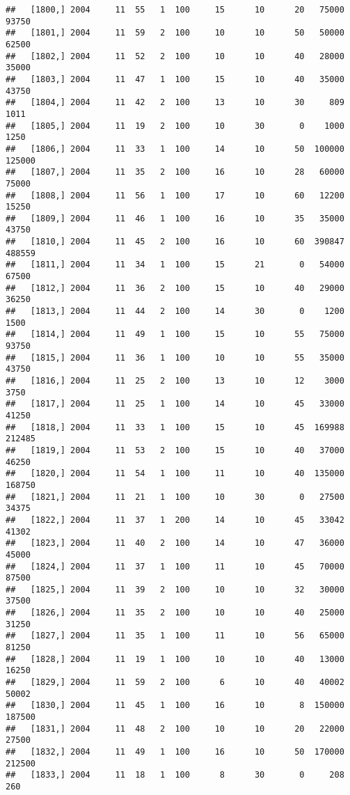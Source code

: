 \documentclass{article}\usepackage[]{graphicx}\usepackage[]{color}
\makeatletter
\newenvironment{kframe}{%
 \def\at@end@of@kframe{}%
 \ifinner\ifhmode%
  \def\at@end@of@kframe{\end{minipage}}%
  \begin{minipage}{\columnwidth}%
 \fi\fi%
 \def\FrameCommand##1{\hskip\@totalleftmargin \hskip-\fboxsep
 \colorbox{shadecolor}{##1}\hskip-\fboxsep
     \hskip-\linewidth \hskip-\@totalleftmargin \hskip\columnwidth}%
 \MakeFramed {\advance\hsize-\width
   \@totalleftmargin\z@ \linewidth\hsize
   \@setminipage}}%
 {\par\unskip\endMakeFramed%
 \at@end@of@kframe}
\newenvironment{knitrout}{}{} %
\makeatother
\begin{document}
\begin{knitrout}
\begin{kframe}
\begin{verbatim}
##   [1800,] 2004     11  55   1  100     15      10      20   75000   93750
##   [1801,] 2004     11  59   2  100     10      10      50   50000   62500
##   [1802,] 2004     11  52   2  100     10      10      40   28000   35000
##   [1803,] 2004     11  47   1  100     15      10      40   35000   43750
##   [1804,] 2004     11  42   2  100     13      10      30     809    1011
##   [1805,] 2004     11  19   2  100     10      30       0    1000    1250
##   [1806,] 2004     11  33   1  100     14      10      50  100000  125000
##   [1807,] 2004     11  35   2  100     16      10      28   60000   75000
##   [1808,] 2004     11  56   1  100     17      10      60   12200   15250
##   [1809,] 2004     11  46   1  100     16      10      35   35000   43750
##   [1810,] 2004     11  45   2  100     16      10      60  390847  488559
##   [1811,] 2004     11  34   1  100     15      21       0   54000   67500
##   [1812,] 2004     11  36   2  100     15      10      40   29000   36250
##   [1813,] 2004     11  44   2  100     14      30       0    1200    1500
##   [1814,] 2004     11  49   1  100     15      10      55   75000   93750
##   [1815,] 2004     11  36   1  100     10      10      55   35000   43750
##   [1816,] 2004     11  25   2  100     13      10      12    3000    3750
##   [1817,] 2004     11  25   1  100     14      10      45   33000   41250
##   [1818,] 2004     11  33   1  100     15      10      45  169988  212485
##   [1819,] 2004     11  53   2  100     15      10      40   37000   46250
##   [1820,] 2004     11  54   1  100     11      10      40  135000  168750
##   [1821,] 2004     11  21   1  100     10      30       0   27500   34375
##   [1822,] 2004     11  37   1  200     14      10      45   33042   41302
##   [1823,] 2004     11  40   2  100     14      10      47   36000   45000
##   [1824,] 2004     11  37   1  100     11      10      45   70000   87500
##   [1825,] 2004     11  39   2  100     10      10      32   30000   37500
##   [1826,] 2004     11  35   2  100     10      10      40   25000   31250
##   [1827,] 2004     11  35   1  100     11      10      56   65000   81250
##   [1828,] 2004     11  19   1  100     10      10      40   13000   16250
##   [1829,] 2004     11  59   2  100      6      10      40   40002   50002
##   [1830,] 2004     11  45   1  100     16      10       8  150000  187500
##   [1831,] 2004     11  48   2  100     10      10      20   22000   27500
##   [1832,] 2004     11  49   1  100     16      10      50  170000  212500
##   [1833,] 2004     11  18   1  100      8      30       0     208     260

\end{verbatim}
\end{kframe}
\end{knitrout}
\end{document}
